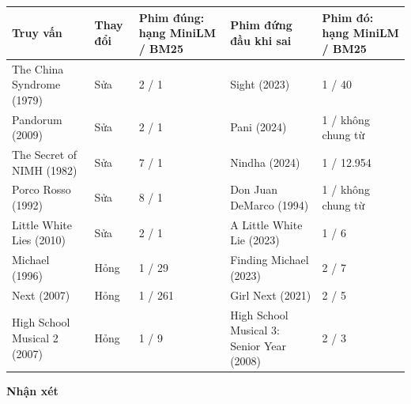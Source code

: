 \documentclass[12pt,a4paper]{article}
\newcommand{\lbl}[1]{\Needspace{6\baselineskip}\textbf{#1}\par\nopagebreak}
\begin{document}
{\def\LTcaptype{}\small
\begin{longtable}[]{@{}*{5}{P{(\linewidth - 8\tabcolsep) * }}@{}}
\toprule
\textbf{Truy vấn} & \textbf{Thay đổi} & \textbf{Phim đúng: hạng MiniLM / BM25} & \textbf{Phim đứng đầu khi sai} & \textbf{Phim đó: hạng MiniLM / BM25} \\
\midrule
\endhead
\bottomrule
\endlastfoot
The China Syndrome (1979) & Sửa & 2 / 1 & Sight (2023) & 1 / 40 \\
Pandorum (2009) & Sửa & 2 / 1 & Pani (2024) & 1 / không chung từ \\
The Secret of NIMH (1982) & Sửa & 7 / 1 & Nindha (2024) & 1 / 12.954 \\
Porco Rosso (1992) & Sửa & 8 / 1 & Don Juan DeMarco (1994) & 1 / không chung từ \\
Little White Lies (2010) & Sửa & 2 / 1 & A Little White Lie (2023) & 1 / 6 \\
Michael (1996) & Hỏng & 1 / 29 & Finding Michael (2023) & 2 / 7 \\
Next (2007) & Hỏng & 1 / 261 & Girl Next (2021) & 2 / 5 \\
High School Musical 2 (2007) & Hỏng & 1 / 9 & High School Musical 3: Senior Year (2008) & 2 / 3 \\
\end{longtable}
}

\lbl{Nhận xét}
\end{document}
